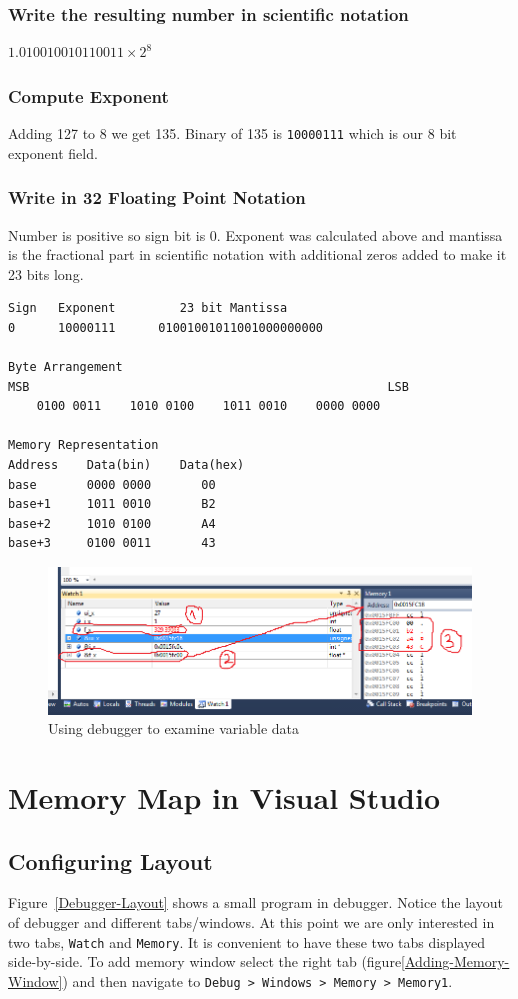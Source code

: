 \documentclass{article}
\begin{document}
\subsubsection{Write the resulting number in scientific notation}
$1.010010010110011 \times 2^8$
\subsubsection{Compute Exponent}
Adding 127 to 8 we get 135. Binary of 135 is \verb|10000111| which is our 8 bit exponent field.
\subsubsection{Write in 32 Floating Point Notation}
Number is positive so sign bit is 0. Exponent was calculated above and mantissa is the fractional part in scientific notation with additional zeros added to make it 23 bits long.
\begin{verbatim}
Sign   Exponent         23 bit Mantissa
0      10000111      01001001011001000000000

Byte Arrangement
MSB                                                  LSB
    0100 0011    1010 0100    1011 0010    0000 0000

Memory Representation
Address    Data(bin)    Data(hex)
base       0000 0000       00
base+1     1011 0010       B2
base+2     1010 0100       A4
base+3     0100 0011       43
\end{verbatim}

\begin{figure}[H]
\centering
\label{Floating-Point-Example}
\includegraphics[scale=0.65]{FloatingPointExample.png}
\caption{Using debugger to examine variable data}
\end{figure}

\section{Memory Map in Visual Studio}
\subsection{Configuring Layout}
Figure~\ref{Debugger-Layout} shows a small program in debugger. Notice the layout of debugger and different tabs/windows. At this point we are only interested in two tabs, \verb|Watch| and \verb|Memory|. It is convenient to have these two tabs displayed side-by-side. To add memory window select the right tab (figure\ref{Adding-Memory-Window}) and then navigate to \verb|Debug > Windows > Memory > Memory1|.
\end{document}
